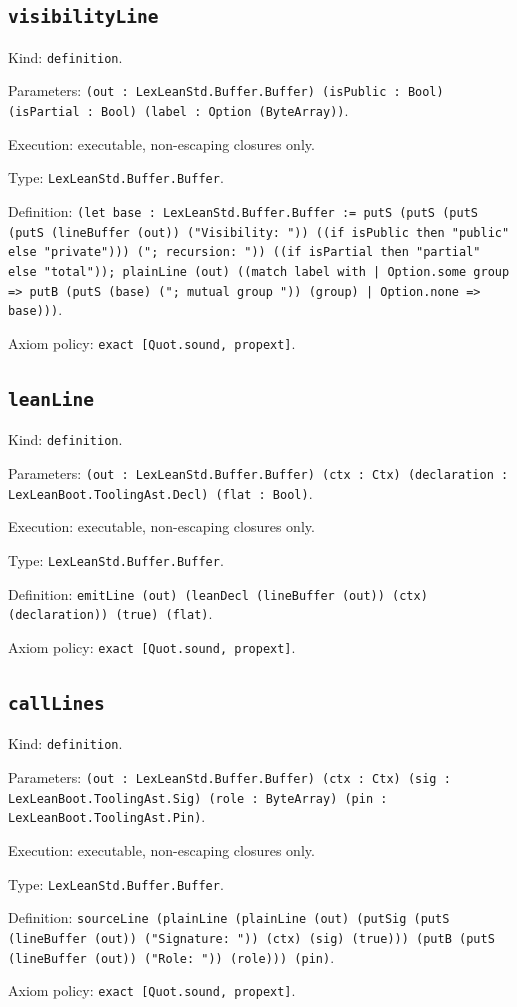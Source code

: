 \documentclass[11pt]{article}
\begin{document}
\subsection*{\texttt{visibilityLine}}
\noindent Kind: \texttt{definition}.\par
\noindent Parameters: \texttt{(out : LexLeanStd.Buffer.Buffer) (isPublic : Bool) (isPartial : Bool) (label : Option (ByteArray))}.\par
\noindent Execution: executable, non-escaping closures only.\par
\noindent Type: \texttt{LexLeanStd.Buffer.Buffer}.\par
\noindent Definition: \texttt{(let base : LexLeanStd.Buffer.Buffer := putS (putS (putS (putS (lineBuffer (out)) ("Visibility: ")) ((if isPublic then "public" else "private"))) ("; recursion: ")) ((if isPartial then "partial" else "total")); plainLine (out) ((match label with | Option.some group => putB (putS (base) ("; mutual group ")) (group) | Option.none => base)))}.\par
\noindent Axiom policy: \texttt{exact [Quot.sound, propext]}.\par
\subsection*{\texttt{leanLine}}
\noindent Kind: \texttt{definition}.\par
\noindent Parameters: \texttt{(out : LexLeanStd.Buffer.Buffer) (ctx : Ctx) (declaration : LexLeanBoot.ToolingAst.Decl) (flat : Bool)}.\par
\noindent Execution: executable, non-escaping closures only.\par
\noindent Type: \texttt{LexLeanStd.Buffer.Buffer}.\par
\noindent Definition: \texttt{emitLine (out) (leanDecl (lineBuffer (out)) (ctx) (declaration)) (true) (flat)}.\par
\noindent Axiom policy: \texttt{exact [Quot.sound, propext]}.\par
\subsection*{\texttt{callLines}}
\noindent Kind: \texttt{definition}.\par
\noindent Parameters: \texttt{(out : LexLeanStd.Buffer.Buffer) (ctx : Ctx) (sig : LexLeanBoot.ToolingAst.Sig) (role : ByteArray) (pin : LexLeanBoot.ToolingAst.Pin)}.\par
\noindent Execution: executable, non-escaping closures only.\par
\noindent Type: \texttt{LexLeanStd.Buffer.Buffer}.\par
\noindent Definition: \texttt{sourceLine (plainLine (plainLine (out) (putSig (putS (lineBuffer (out)) ("Signature: ")) (ctx) (sig) (true))) (putB (putS (lineBuffer (out)) ("Role: ")) (role))) (pin)}.\par
\noindent Axiom policy: \texttt{exact [Quot.sound, propext]}.\par
\end{document}
